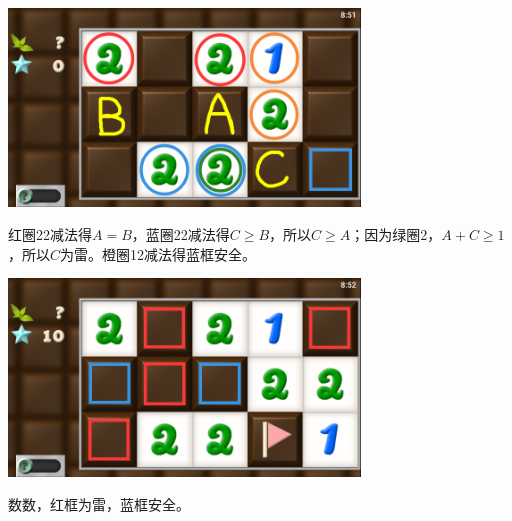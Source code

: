 \subsection{} %
\begin{center}
    \includegraphics[width=0.7\textwidth]{puzzle/112-1.png}
\end{center}
红圈22减法得$A=B$，蓝圈22减法得$C\ge B$，所以$C\ge A$；因为绿圈2，$A+C\ge 1$，所以$C$为雷。橙圈12减法得蓝框安全。
\begin{center}
    \includegraphics[width=0.7\textwidth]{puzzle/112-2.png}
\end{center}
数数，红框为雷，蓝框安全。


